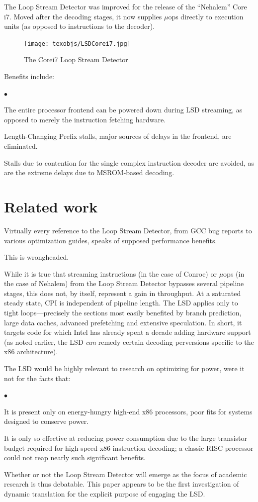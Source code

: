 \documentclass[]{sigplanconf}
\newcommand{\squishlist}{\begin{list}{$\bullet$}
  {\setlength{\itemsep}{0pt}
    \setlength{\parsep}{3pt}
    \setlength{\topsep}{3pt}
    \setlength{\partopsep}{0pt}
    \setlength{\leftmargin}{1.5em}
    \setlength{\labelwidth}{1em}
    \setlength{\labelsep}{0.5em}}}
\newcommand{\squishend}{\end{list}}
\begin{document}
The Loop Stream Detector was improved for the release of the ``Nehalem''
Core i7. Moved after the decoding stages, it now supplies $\mu$ops directly
to execution units (as opposed to instructions to the decoder).
\begin{figure}[h]
\texttt{[image: texobjs/LSDCorei7.jpg]}
\caption{The Core\texttrademark  i7 Loop Stream Detector}
\label{fig:lsdcorei7}
\end{figure}
Benefits include:
\squishlist
\item The entire processor frontend can be powered down during LSD streaming,
as opposed to merely the instruction fetching hardware.
\item Length-Changing Prefix stalls, major sources of delays in the frontend,
are eliminated.
\item Stalls due to contention for the single complex instruction decoder are
avoided, as are the extreme delays due to MSROM-based decoding.
\squishend
\section{Related work}
Virtually every reference to the Loop Stream Detector, from GCC bug reports
\cite{gcclsd} to various optimization guides, speaks of supposed performance benefits.

This is wrongheaded.

While it is true that streaming instructions (in the case of Conroe) or $\mu$ops
(in the case of Nehalem) from the Loop Stream Detector bypasses several pipeline stages,
this does not, by itself, represent a gain in throughput. At a saturated steady
state, CPI is independent of pipeline length. The LSD applies only to tight
loops---precisely the sections most easily benefited by branch prediction,
large data caches, advanced prefetching and extensive speculation. In short,
it targets code for which Intel has already spent a decade adding hardware
support (as noted earlier, the LSD \textit{can} remedy certain decoding
perversions specific to the x86 architecture).

The LSD would be highly relevant to research on optimizing for power, were it
not for the facts that:
\squishlist
\item It is present only on energy-hungry high-end x86 processors, poor fits for
systems designed to conserve power.
\item It is only so effective at reducing power consumption due to the large
transistor budget required for high-speed x86 instruction decoding; a classic
RISC processor could not reap nearly such significant benefits.
\squishend
Whether or not the Loop Stream Detector will emerge as the focus of academic
research is thus debatable. This paper appears to be the first investigation
of dynamic translation for the explicit purpose of engaging the LSD.
\appendix
\end{document}
